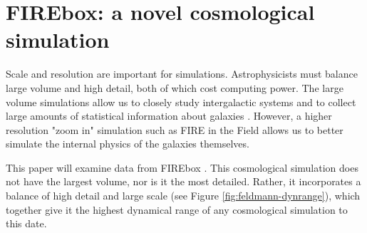 \section{FIREbox: a novel cosmological simulation}
Scale and resolution are important for simulations. Astrophysicists must balance large volume and high detail, both of which cost computing power. The large volume simulations allow us to closely study intergalactic systems and to collect large amounts of statistical information about galaxies \citep{feldmannFIREboxSimulatingGalaxies2022}. However, a higher resolution "zoom in" simulation such as FIRE in the Field \citep{fittsFireFieldSimulating2017} allows us to better simulate the internal physics of the galaxies themselves.

This paper will examine data from FIREbox \citep{feldmannFIREboxSimulatingGalaxies2022}. This cosmological simulation does not have the largest volume, nor is it the most detailed. Rather, it incorporates a balance of high detail and large scale (see Figure \ref{fig:feldmann-dynrange}), which together give it the highest dynamical range of any cosmological simulation to this date.

